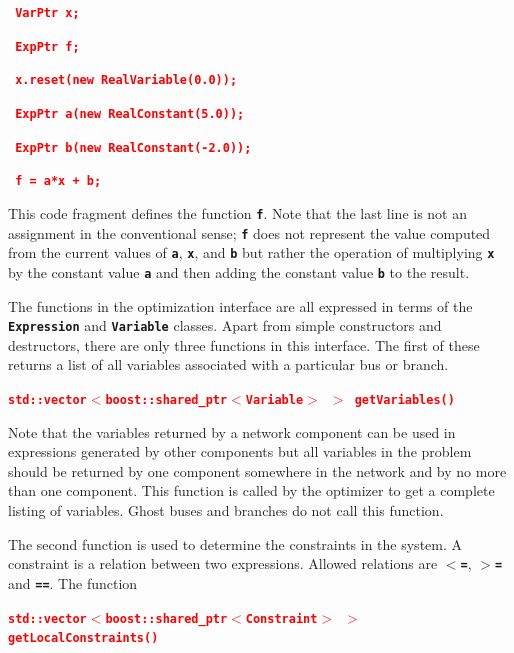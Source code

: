 \documentclass[12pt]{report} %
\begin{document}
\textcolor{red}{\texttt{\textbf{    VarPtr x;}}}

\textcolor{red}{\texttt{\textbf{    ExpPtr f;}}}

\textcolor{red}{\texttt{\textbf{    x.reset(new RealVariable(0.0));}}}

\textcolor{red}{\texttt{\textbf{    ExpPtr a(new RealConstant(5.0));}}}

\textcolor{red}{\texttt{\textbf{    ExpPtr b(new RealConstant(-2.0));}}}

\textcolor{red}{\texttt{\textbf{    f = a*x + b;}}}

This code fragment defines the function \texttt{\textbf{f}}. Note that the last line is not an assignment in the conventional sense; \texttt{\textbf{f}} does not represent the value computed from the current values of \texttt{\textbf{a}}, \texttt{\textbf{x}}, and \texttt{\textbf{b}} but rather the operation of multiplying \texttt{\textbf{x}} by the constant value \texttt{\textbf{a}} and then adding the constant value \texttt{\textbf{b}} to the result.

The functions in the optimization interface are all expressed in terms of the \texttt{\textbf{Expression}} and \texttt{\textbf{Variable}} classes. Apart from simple constructors and destructors, there are only three functions in this interface. The first of these returns a list of all variables associated with a particular bus or branch.

\textcolor{red}{\texttt{\textbf{std::vector$\boldsymbol{\mathrm{<}}$boost::shared\_ptr$\boldsymbol{\mathrm{<}}$Variable$\boldsymbol{\mathrm{>}}$ $\boldsymbol{\mathrm{>}}$ getVariables()}}}

Note that the variables returned by a network component can be used in expressions generated by other components but all variables in the problem should be returned by one component somewhere in the network and by no more than one component. This function is called by the optimizer to get a complete listing of variables. Ghost buses and branches do not call this function.

The second function is used to determine the constraints in the system. A constraint is a relation between two expressions. Allowed relations are \texttt{\textbf{$\boldsymbol{\mathrm{<}}$=}}, \texttt{\textbf{$\boldsymbol{\mathrm{>}}$=}} and \texttt{\textbf{==}}. The function

\textcolor{red}{\texttt{\textbf{std::vector$\boldsymbol{\mathrm{<}}$boost::shared\_ptr$\boldsymbol{\mathrm{<}}$Constraint$\boldsymbol{\mathrm{>}}$ $\boldsymbol{\mathrm{>}}$ getLocalConstraints()}}}
\end{document}
